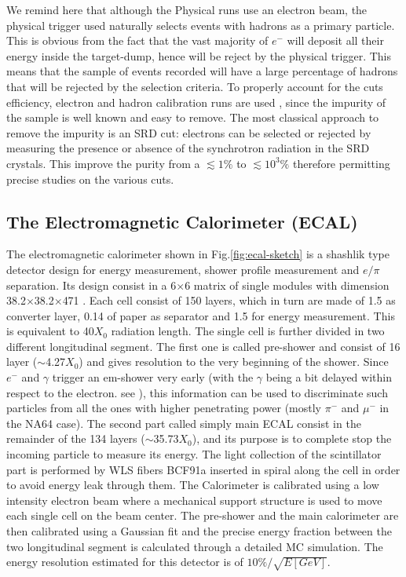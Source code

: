 We remind here that although the Physical runs use an electron beam, the physical trigger used naturally selects events with hadrons as a primary particle. This is obvious from the fact that the vast majority of $e^-$ will deposit all their energy inside the target-dump, hence will be reject by the physical trigger. This means that the sample of events recorded will have a large percentage of hadrons that will be rejected by the selection criteria. To properly account for the cuts efficiency, electron and hadron calibration runs are used , since the impurity of the sample is well known and easy to remove. The most classical approach to remove the impurity is an SRD cut: electrons can be selected or rejected by measuring the presence or absence  of the synchrotron radiation in the SRD crystals. This improve the purity from a $\lesssim 1\%$ to $\lesssim 10^{3}\%$ therefore permitting precise studies on the various cuts. 

\subsection{The Electromagnetic Calorimeter (ECAL)}
\label{ch2:sec:detectors-ecal}

The electromagnetic calorimeter shown in Fig.\ref{fig:ecal-sketch} is a shashlik type detector design for energy measurement, shower profile measurement and $e/\pi$ separation. Its design consist in a 6$\times$6 matrix of single modules with dimension 38.2$\times$38.2$\times$471 \mmc. Each cell consist of 150 layers, which in turn are made of 1.5 \mmi as converter layer, 0.14 \mmi of paper as separator and 1.5 \mmi for energy measurement. This is equivalent to 40$X_0$ radiation length. The single cell is further divided in two different longitudinal segment. The first one is called pre-shower and consist of 16 layer ($\sim$4.27$X_0$) and gives resolution to the very beginning of the shower. Since $e^-$ and $\gamma$ trigger an em-shower very early (with the $\gamma$ being a bit delayed within respect to the electron. see \cite{Bichsel:2002cf}), this information can be used to discriminate such particles from all the ones with higher penetrating power (mostly $\pi^-$ and $\mu^-$ in the NA64 case). The second part called simply main ECAL consist in the remainder of the 134 layers ($\sim$35.73$X_0$), and its purpose is to complete stop the incoming particle to measure its energy. The light collection of the scintillator part is performed by WLS fibers BCF91a \cite{wls-fibers} inserted in spiral along the cell in order to avoid energy leak through them. The Calorimeter is calibrated using a low intensity electron beam where a mechanical support structure is used to move each single cell on the beam center. The pre-shower and the main calorimeter are then calibrated using a Gaussian fit and the precise energy fraction between the two longitudinal segment is calculated through a detailed MC simulation. The energy resolution estimated for this detector is of $10\% / \sqrt{E[GeV]}$.

